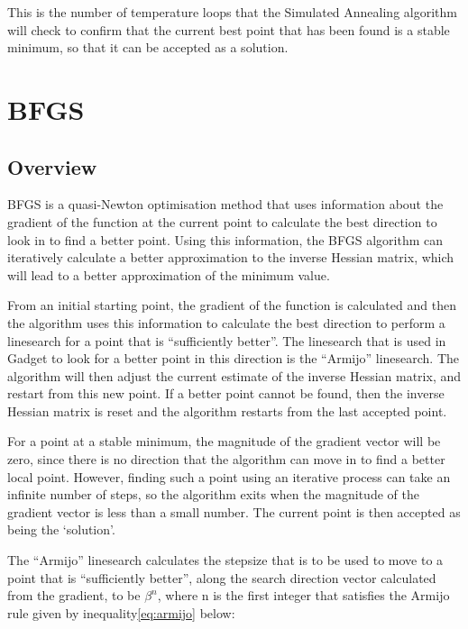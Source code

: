 \documentclass[]{book}
\begin{document}
This is the number of temperature loops that the Simulated Annealing
algorithm will check to confirm that the current best point that has
been found is a stable minimum, so that it can be accepted as a
solution.

\hypertarget{sec:bfgs}{%
\section{BFGS}\label{sec:bfgs}}

\hypertarget{subsec:bfgsover}{%
\subsection{Overview}\label{subsec:bfgsover}}

BFGS is a quasi-Newton optimisation method that uses information about
the gradient of the function at the current point to calculate the best
direction to look in to find a better point. Using this information, the
BFGS algorithm can iteratively calculate a better approximation to the
inverse Hessian matrix, which will lead to a better approximation of the
minimum value.

From an initial starting point, the gradient of the function is
calculated and then the algorithm uses this information to calculate the
best direction to perform a linesearch for a point that is ``sufficiently
better''. The linesearch that is used in Gadget to look for a better
point in this direction is the ``Armijo'' linesearch. The algorithm will
then adjust the current estimate of the inverse Hessian matrix, and
restart from this new point. If a better point cannot be found, then the
inverse Hessian matrix is reset and the algorithm restarts from the last
accepted point.

For a point at a stable minimum, the magnitude of the gradient vector
will be zero, since there is no direction that the algorithm can move in
to find a better local point. However, finding such a point using an
iterative process can take an infinite number of steps, so the algorithm
exits when the magnitude of the gradient vector is less than a small
number. The current point is then accepted as being the `solution'.

The ``Armijo'' linesearch calculates the stepsize that is to be used to
move to a point that is ``sufficiently better'', along the search
direction vector calculated from the gradient, to be \(\beta^n\), where n
is the first integer that satisfies the Armijo rule given by
inequality\eqref{eq:armijo} below:
\end{document}
